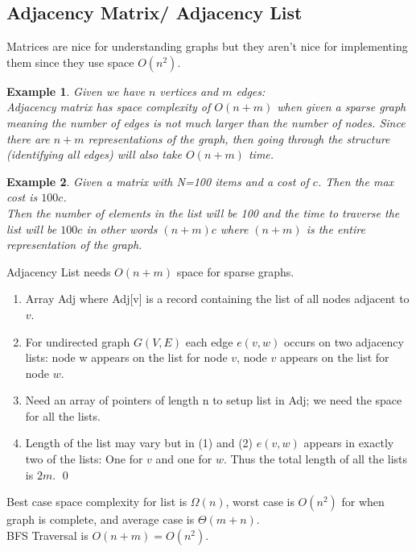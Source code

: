 \documentclass[12pt]{article}
\newtheorem*{ex}{Example}
\begin{document}
\subsection{Adjacency Matrix/ Adjacency List}
Matrices are nice for understanding graphs but they aren't nice for implementing them since they use space $O(n^2)$.\\
\begin{ex}
Given we have $n$ vertices and $m$ edges:\\
Adjacency matrix has space complexity of $O(n+m)$ when given a sparse graph meaning the number of edges is not much larger than the number of nodes. Since there are $n+m$ representations of the graph, then going through the structure (identifying all edges) will also take $O(n+m)$ time.
\end{ex}
\begin{ex}
Given a matrix with N=100 items and a cost of $c$. Then the max cost is $100c$.\\
Then the number of elements in the list will be 100 and the time to traverse the list will be $100c$ in other words $(n+m)c$ where $(n+m)$ is the entire representation of the graph.
\end{ex}

Adjacency List needs $O(n+m)$ space for sparse graphs.
\begin{enumerate}
\item Array Adj where Adj[v] is a record containing the list of all nodes adjacent to $v$.
\item For undirected graph $G(V,E)$ each edge $e(v,w)$ occurs on two adjacency lists: node w appears on the list for node $v$, node $v$ appears on the list for node $w$.
\item Need an array of pointers of length n to setup list in Adj; we need the space for all the lists.
\item Length of the list may vary but in (1) and (2) $e(v,w)$ appears in exactly two of the lists: One for $v$ and one for $w$. Thus the total length of all the lists is $2m$. \qed
\end{enumerate}
Best case space complexity for list is $\Omega(n)$, worst case is $O(n^2)$ for when graph is complete, and average case is $\Theta(m+n)$.\\
BFS Traversal is $O(n+m) = O(n^2)$.
\end{document}
